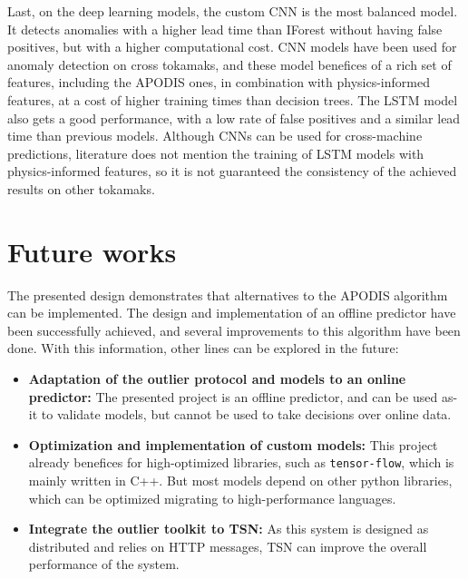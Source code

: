 Last, on the deep learning models, the custom \ac{CNN} is the most balanced model. It detects anomalies with a higher lead time than \ac{IForest} without having false positives, but with a higher computational cost. \ac{CNN} models have been used for anomaly detection on cross tokamaks, and these model benefices of a rich set of features, including the \ac{APODIS} ones, in combination with physics-informed features, at a cost of higher training times than decision trees. The \ac{LSTM} model also gets a good performance, with a low rate of false positives and a similar lead time than previous models. Although \ac{CNN}s can be used for cross-machine predictions, literature does not mention the training of \ac{LSTM} models with physics-informed features, so it is not guaranteed the consistency of the achieved results on other tokamaks. 

\section{Future works}

The presented design demonstrates that alternatives to the \ac{APODIS} algorithm can be implemented. The design and implementation of an offline predictor have been successfully achieved, and several improvements to this algorithm have been done. With this information, other lines can be explored in the future:

\begin{itemize}
    \item \textbf{Adaptation of the outlier protocol and models to an online predictor:} The presented project is an offline predictor, and can be used as-it to validate models, but cannot be used to take decisions over online data.
    \item \textbf{Optimization and implementation of custom models:} This project already benefices for high-optimized libraries, such as \texttt{tensor-flow}, which is mainly written in C++. But most models depend on other python libraries, which can be optimized migrating to high-performance languages.
    \item \textbf{Integrate the outlier toolkit to \acs{TSN}:} As this system is designed as distributed and relies on HTTP messages, \ac{TSN} can improve the overall performance of the system.
\end{itemize}

